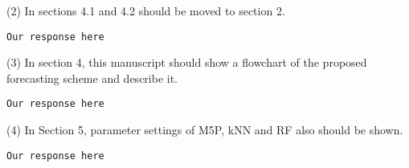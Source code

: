 \documentclass[preprint]{elsarticle}
\begin{document}
\noindent (2) In sections 4.1 and 4.2 should be moved to section 2.\\

\begin{verbatim}
Our response here
\end{verbatim}


\noindent (3) In section 4, this manuscript should show a flowchart of the proposed forecasting scheme and describe it.\\

\begin{verbatim}
Our response here
\end{verbatim}


\noindent (4) In Section 5, parameter settings of M5P, kNN and RF also should be shown.

\begin{verbatim}
Our response here
\end{verbatim}
\end{document}
